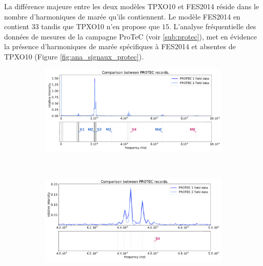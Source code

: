 \documentclass[10pt,a4paper,titlepage]{article}
\begin{document}
La différence majeure entre les deux modèles TPXO10 et FES2014 réside dans le nombre d'harmoniques de marée qu'ils contiennent.
Le modèle FES2014 en contient $33$ tandis que TPXO10 n'en propose que $15$.
L'analyse fréquentielle des données de mesures de la campagne ProTeC (voir \ref{sub:protec}), met en évidence la présence d'harmoniques de marée spécifiques à FES2014 et absentes de TPXO10 (Figure \ref{fig:ana_signaux_protec}).

\begin{figure}[H]
    \centering
    \begin{subfigure}{1.\linewidth}
        \centering
        \includegraphics[scale=0.4]{../images/post_traitement/PROTEC1_PROTEC2_analyse.pdf}
        \caption{}
    \end{subfigure}
    \\
    \begin{subfigure}{0.45\linewidth}
        \centering
        \includegraphics[width=\linewidth]{../images/post_traitement/PROTEC1_PROTEC2_analyse_zoom2.pdf}
        \caption{}
    \end{subfigure}

\end{figure}
\end{document}
